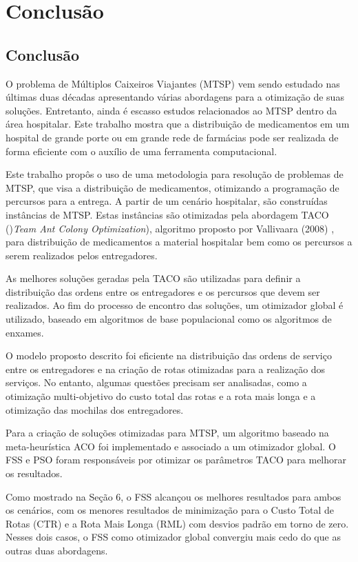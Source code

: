\chapter{Conclusão}


\section{Conclusão}

O problema de Múltiplos Caixeiros Viajantes (MTSP) vem sendo estudado nas últimas duas décadas apresentando várias abordagens para a otimização de suas soluções. Entretanto, ainda é escasso estudos relacionados ao MTSP dentro da área hospitalar. Este trabalho mostra que a distribuição de medicamentos em um hospital de grande porte ou em grande rede de farmácias pode ser realizada de forma eficiente com o auxílio de uma ferramenta computacional.

Este trabalho propôs o uso de uma metodologia para resolução de problemas de MTSP, que visa a distribuição de medicamentos, otimizando a programação de percursos para a entrega. A partir de um cenário hospitalar, são construídas instâncias de MTSP. Estas instâncias são otimizadas pela abordagem TACO ()\textit{Team Ant Colony Optimization}), algoritmo proposto por Vallivaara (2008) \cite{vallivaara2008team}, para distribuição de medicamentos a material hospitalar bem como os percursos a serem realizados pelos entregadores.

As melhores soluções geradas pela TACO são utilizadas para definir a distribuição das ordens entre os entregadores e os percursos que devem ser realizados. Ao fim do processo de encontro das soluções, um otimizador global é utilizado, baseado em algoritmos de base populacional como os algoritmos de enxames.

O modelo proposto descrito foi eficiente na distribuição das ordens de serviço entre os entregadores e na criação de rotas otimizadas para a realização dos serviços. No entanto, algumas questões precisam ser analisadas, como a otimização multi-objetivo do custo total das rotas e a rota mais longa e a otimização das mochilas dos entregadores.

Para a criação de soluções otimizadas para MTSP, um algoritmo baseado na meta-heurística ACO foi implementado e associado a um otimizador global. O FSS e PSO foram responsáveis por otimizar os parâmetros TACO para melhorar os resultados.

Como mostrado na Seção 6, o FSS alcançou os melhores resultados para ambos os cenários, com os menores resultados de minimização para o Custo Total de Rotas (CTR) e a Rota Mais Longa (RML) com desvios padrão em torno de zero. Nesses dois casos, o FSS como otimizador global convergiu mais cedo do que as outras duas abordagens.

